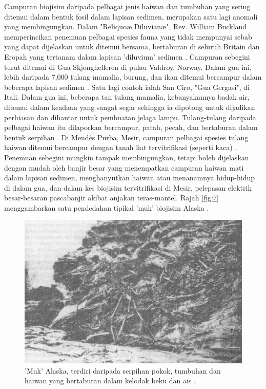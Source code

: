 \documentclass[10pt,twocolumn,letterpaper]{article}
\begin{document}
Campuran biojisim daripada pelbagai jenis haiwan dan tumbuhan yang sering ditemui dalam bentuk fosil dalam lapisan sedimen, merupakan satu lagi anomali yang membingungkan. Dalam "Reliquoæ Diluvianæ", Rev. William Buckland memperincikan penemuan pelbagai spesies fauna yang tidak mempunyai sebab yang dapat dijelaskan untuk ditemui bersama, bertaburan di seluruh Britain dan Eropah yang tertanam dalam lapisan 'diluvium' sedimen \cite{58}. Campuran sebegini turut ditemui di Gua Skjonghelleren di pulau Valdroy, Norway. Dalam gua ini, lebih daripada 7,000 tulang mamalia, burung, dan ikan ditemui bercampur dalam beberapa lapisan sedimen \cite{59}. Satu lagi contoh ialah San Ciro, "Gua Gergasi", di Itali. Dalam gua ini, beberapa tan tulang mamalia, kebanyakannya badak air, ditemui dalam keadaan yang sangat segar sehingga ia dipotong untuk dijadikan perhiasan dan dihantar untuk pembuatan jelaga lampu. Tulang-tulang daripada pelbagai haiwan itu dilaporkan bercampur, patah, pecah, dan bertaburan dalam bentuk serpihan \cite{60,61}. Di Mendès Purba, Mesir, campuran pelbagai spesies tulang haiwan ditemui bercampur dengan tanah liat tervitrifikasi (seperti kaca) \cite{57}. Penemuan sebegini mungkin tampak membingungkan, tetapi boleh dijelaskan dengan mudah oleh banjir besar yang menempatkan campuran haiwan mati dalam lapisan sedimen, menghanyutkan haiwan atau menanamnya hidup-hidup di dalam gua, dan dalam kes biojisim tervitrifikasi di Mesir, pelepasan elektrik besar-besaran pascabanjir akibat anjakan teras-mantel. Rajah \ref{fig:7} menggambarkan satu pendedahan tipikal 'muk' biojisim Alaska \cite{56}.

\begin{figure}[t]
\begin{center}
   \includegraphics[width=1\linewidth]{muck-crop.jpeg}
\end{center}
   \caption{'Muk' Alaska, terdiri daripada serpihan pokok, tumbuhan dan haiwan yang bertaburan dalam kelodak beku dan ais \cite{146}.}
\label{fig:7}
\label{fig:onecol}
\end{figure}
\end{document}
